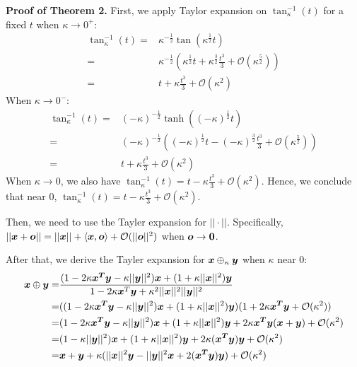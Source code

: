{\bf Proof of Theorem 2.} First, we apply Taylor expansion on $\tan_\kappa^{-1}(t)$ for a fixed $t$ when $\kappa\rightarrow 0^+$: 
\begin{equation*}
\begin{aligned}
    \tan_\kappa^{-1}(t)=&\kappa^{-\frac{1}{2}}\tan(\kappa^\frac{1}{2}t)\\
    =&\kappa^{-\frac{1}{2}}(\kappa^\frac{1}{2}t+\kappa^\frac{3}{2}\frac{t^3}{3}+\mathcal{O}(\kappa^\frac{5}{2}))\\
    =&t+\kappa\frac{t^3}{3} + \mathcal{O}(\kappa^2)
\end{aligned}
\end{equation*}
When $\kappa\rightarrow 0^-$:
\begin{equation*}
\begin{aligned}
    \tan_\kappa^{-1}(t)=&(-\kappa)^{-\frac{1}{2}}\tanh((-\kappa)^\frac{1}{2}t)\\
    =&(-\kappa)^{-\frac{1}{2}}((-\kappa)^\frac{1}{2}t-(-\kappa)^\frac{3}{2}\frac{t^3}{3}+\mathcal{O}(\kappa^\frac{5}{2}))\\
    =&t+\kappa\frac{t^3}{3}+\mathcal{O}(\kappa^2)
\end{aligned}
\end{equation*}
When $\kappa\rightarrow 0$, we also have $\tan_\kappa^{-1}(t)=t-\kappa\frac{t^3}{3}+\mathcal{O}(\kappa^2)$. Hence, we conclude that near 0, $\tan_\kappa^{-1}(t)=t-\kappa\frac{t^3}{3}+\mathcal{O}(\kappa^2)$. 

Then, we need to use the Tayler expansion for $||\cdot||$. Specifically, $||\boldsymbol{x}+\boldsymbol{o}||=||\boldsymbol{x}||+\langle \boldsymbol{x}, \boldsymbol{o}\rangle+\mathcal{O}(||\boldsymbol{o}||^2)$ when $\boldsymbol{o}\rightarrow \boldsymbol{0}$. 

After that, we derive the Tayler expansion for $\boldsymbol{x}\oplus_\kappa\boldsymbol{y}$ when $\kappa$ near 0: 
\begin{equation*}
\begin{aligned}
\boldsymbol{x}\oplus\boldsymbol{y}=&\frac{(1-2\kappa\boldsymbol{x^T}\boldsymbol{y}-\kappa||\boldsymbol{y}||^2)\boldsymbol{x}+(1+\kappa||\boldsymbol{x}||^2)\boldsymbol{y}}{1-2\kappa\boldsymbol{x}^T\boldsymbol{y}+\kappa^2||\boldsymbol{x}||^2||\boldsymbol{y}||^2}\\
=&((1-2\kappa\boldsymbol{x^T}\boldsymbol{y}-\kappa||\boldsymbol{y}||^2)\boldsymbol{x}+(1+\kappa||\boldsymbol{x}||^2)\boldsymbol{y})(1+2\kappa\boldsymbol{x^T}\boldsymbol{y}+\mathcal{O}(\kappa^2))\\
=&(1-2\kappa\boldsymbol{x^T}\boldsymbol{y}-\kappa||\boldsymbol{y}||^2)\boldsymbol{x}+(1+\kappa||\boldsymbol{x}||^2)\boldsymbol{y}+2\kappa\boldsymbol{x^T}\boldsymbol{y}(\boldsymbol{x}+\boldsymbol{y})+\mathcal{O}(\kappa^2)\\
=&(1-\kappa||\boldsymbol{y}||^2)\boldsymbol{x}+(1+\kappa||\boldsymbol{x}||^2)\boldsymbol{y}+2\kappa(\boldsymbol{x^T}\boldsymbol{y})\boldsymbol{y}+\mathcal{O}(\kappa^2)\\
=&\boldsymbol{x}+\boldsymbol{y}+\kappa(||\boldsymbol{x}||^2\boldsymbol{y}-||\boldsymbol{y}||^2\boldsymbol{x}+2(\boldsymbol{x^T}\boldsymbol{y})\boldsymbol{y})+\mathcal{O}(\kappa^2)
\end{aligned}
\end{equation*}

